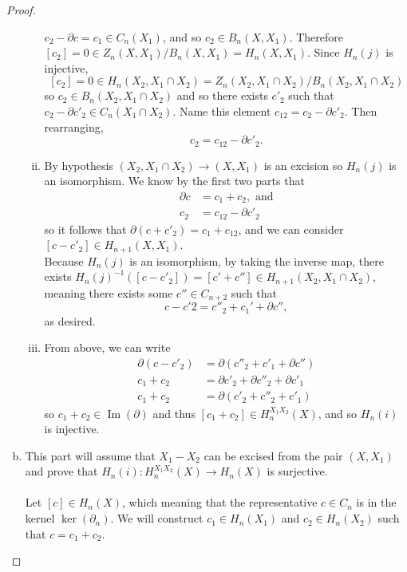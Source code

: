 \documentclass{article}
\newcommand{\fn}[3]{#1 \colon #2 \rightarrow #3}
\DeclareMathOperator{\im}{Im}
\begin{document}
\begin{proof}
\begin{enumerate}[a.]
\begin{enumerate}[(i)]
      $c_2 - \partial c = c_1 \in C_n(X_1)$, and so $c_2 \in B_n(X, X_1)$.
      Therefore $[c_2] = 0 \in Z_n(X, X_1)/B_n(X, X_1) = H_n(X, X_1).$ Since
      $H_n(j)$ is injective, \[
        [c_2] = 0 \in H_n(X_2, X_1 \cap X_2) = Z_n(X_2, X_1 \cap X_2)/B_n(X_2, X_1 \cap X_2)
      \] so $c_2 \in B_n(X_2, X_1 \cap X_2)$ and so there exists $c'_2$ such that
      $c_2 - \partial c'_2 \in C_n(X_1 \cap X_2)$.
      Name this element $c_{12} = c_2 - \partial c'_2$. Then rearranging, \[
        c_2 = c_{12} - \partial c'_2.
      \]
      \item By hypothesis $(X_2, X_1 \cap X_2) \rightarrow (X, X_1)$ is an
      excision so $H_n(j)$ is an isomorphism.
      We know by the first two parts that \begin{align*}
        \partial c &= c_1 + c_2, \text{ and}\\
        c_2 &= c_{12} - \partial{c'_2}
      \end{align*} so it follows that $\partial(c + c'_2) = c_1 + c_{12}$, and
      we can consider $[c - c'_2] \in H_{n+1}(X, X_1)$.
      \\
      Because $H_n(j)$ is an isomorphism, by taking the inverse map, there
      exists $H_n(j)^{-1}([c-c'_2]) = [c' + c''] \in H_{n+1}(X_2, X_1 \cap X_2)$,
      meaning there exists some $c'' \in C_{n+2}$ such that \[
        c-c'2 = c''_2 + c_1' + \partial c'',
      \] as desired.
      \item From above, we can write \begin{align*}
        \partial(c - c'_2) &= \partial(c''_2 + c'_1 + \partial c'') \\
        c_1 + c_2 &= \partial c'_2 + \partial c''_2 + \partial c'_1 \\
        c_1 + c_2 &= \partial(c'_2 + c''_2 + c'_1)
      \end{align*} so $c_1 + c_2 \in \im(\partial)$ and thus
      $[c_1 + c_2] \in H^{X_1X_2}_n(X)$, and so $H_n(i)$ is injective.
    \end{enumerate}
    \item This part will assume that $X_1 - X_2$ can be excised from the pair
    $(X, X_1)$ and prove that $\fn{H_n(i)}{H_n^{X_1X_2}(X)}{H_n(X)}$ is surjective.
    \\~\\
    Let $[c] \in H_n(X)$, which meaning that the representative $c \in C_n$ is
    in the kernel $\ker(\partial_n)$. We will construct $c_1 \in H_n(X_1)$ and
    $c_2 \in H_n(X_2)$ such that $c = c_1 + c_2$.
    \\

\end{enumerate}
\end{proof}
\end{document}
